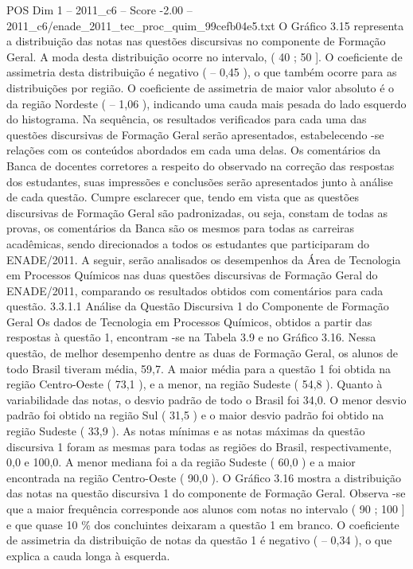 \begin{textsample}{POS Dim 1 – 2011\_c6 – Score -2.00 – 2011\_c6/enade\_2011\_tec\_proc\_quim\_99cefb04e5.txt}
O Gráfico 3.15 representa a distribuição das notas nas questões discursivas no componente de Formação Geral.
A moda desta distribuição ocorre no intervalo, ( 40 ; 50 ].
O coeficiente de assimetria desta distribuição é negativo ( – 0,45 ), o que também ocorre para as distribuições por região.
O coeficiente de assimetria de maior valor absoluto é o da região Nordeste ( – 1,06 ), indicando uma cauda mais pesada do lado esquerdo do histograma.
Na sequência, os resultados verificados para cada uma das questões discursivas de Formação Geral serão apresentados, estabelecendo -se relações com os conteúdos abordados em cada uma delas.
Os comentários da Banca de docentes corretores a respeito do observado na correção das respostas dos estudantes, suas impressões e conclusões serão apresentados junto à análise de cada questão.
Cumpre esclarecer que, tendo em vista que as questões discursivas de Formação Geral são padronizadas, ou seja, constam de todas as provas, os comentários da Banca são os mesmos para todas as carreiras acadêmicas, sendo direcionados a todos os estudantes que participaram do ENADE/2011.
A seguir, serão analisados os desempenhos da Área de Tecnologia em Processos Químicos nas duas questões discursivas de Formação Geral do ENADE/2011, comparando os resultados obtidos com comentários para cada questão. 3.3.1.1 Análise da Questão Discursiva 1 do Componente de Formação Geral Os dados de Tecnologia em Processos Químicos, obtidos a partir das respostas à questão 1, encontram -se na Tabela 3.9 e no Gráfico 3.16.
Nessa questão, de melhor desempenho dentre as duas de Formação Geral, os alunos de todo Brasil tiveram média, 59,7.
A maior média para a questão 1 foi obtida na região Centro-Oeste ( 73,1 ), e a menor, na região Sudeste ( 54,8 ).
Quanto à variabilidade das notas, o desvio padrão de todo o Brasil foi 34,0.
O menor desvio padrão foi obtido na região Sul ( 31,5 ) e o maior desvio padrão foi obtido na região Sudeste ( 33,9 ).
As notas mínimas e as notas máximas da questão discursiva 1 foram as mesmas para todas as regiões do Brasil, respectivamente, 0,0 e 100,0.
A menor mediana foi a da região Sudeste ( 60,0 ) e a maior encontrada na região Centro-Oeste ( 90,0 ).
O Gráfico 3.16 mostra a distribuição das notas na questão discursiva 1 do componente de Formação Geral.
Observa -se que a maior frequência corresponde aos alunos com notas no intervalo ( 90 ; 100 ] e que quase 10 \% dos concluintes deixaram a questão 1 em branco.
O coeficiente de assimetria da distribuição de notas da questão 1 é negativo ( – 0,34 ), o que explica a cauda longa à esquerda.

\end{textsample}
